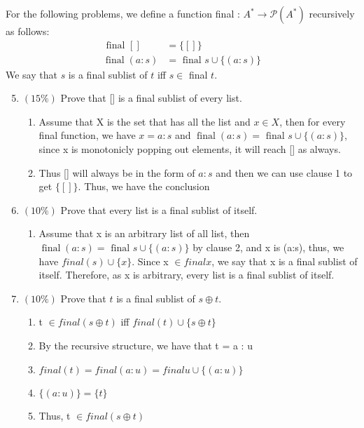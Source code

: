\documentclass[10pt]{article}
\begin{document}
For the following problems, we define a function final : $A^{*} \rightarrow \mathcal{P}\left(A^{*}\right)$ recursively as follows:
$$
\begin{aligned}
\text { final }[] &=\{[]\} \\
\operatorname{final}(a: s) &=\text { final } s \cup\{(a: s)\}
\end{aligned}
$$
We say that $s$ is a final sublist of $t$ iff $s \in$ final $t$.

\begin{enumerate}
  \setcounter{enumi}{4}
  \item $(15 \%)$ Prove that [] is a final sublist of every list.
  \begin{enumerate}
    \item Assume that X is the set that has all the list and $x \in X$, then for every final function, we have $x = a: s$ and $\operatorname{final}(a: s) =\text { final } s \cup\{(a: s)\}$, since x is monotonicly popping out elements, it will reach [] as always. 
    \item Thus [] will always be in the form of $a : s$ and then we can use clause 1 to get $\{[]\}$. Thus, we have the conclusion
  \end{enumerate}
  \item $(10 \%)$ Prove that every list is a final sublist of itself.
  \begin{enumerate}
    \item Assume that x is an arbitrary list of all list, then $\operatorname{final}(a: s) =\text { final } s \cup\{(a: s)\}$ by clause 2, and x is (a:s), thus, we have ${final} (s) \cup \{x\}$. Since x $\in final x$, we say that x is a final sublist of itself. Therefore, as x is arbitrary, every list is a final sublist of itself. 
  \end{enumerate}
  \item $(10 \%)$ Prove that $t$ is a final sublist of $s \oplus t$.
  \begin{enumerate}
    \item t $\in final(s \oplus t)$ iff ${final}(t)\cup \{s \oplus t\}$ 
    \item By the recursive structure, we have that t = a : u
    \item $final(t) = final(a:u) = final u \cup \{(a:u)\}$ 
    \item $\{(a:u)\} = \{t\}$
    \item Thus, t $\in final(s \oplus t)$
  \end{enumerate}


\end{enumerate}
\end{document}
